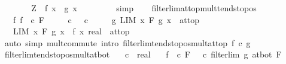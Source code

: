 \begin{isabellebody}
\ \ \ \ \isamarkupfalse%
\ \isamarkupfalse%
\ {\isachardoublequoteopen}Z\ {\isasymle}\ f\ x\ {\isacharasterisk}{\kern0pt}\ g\ x{\isachardoublequoteclose}\isanewline
\ \ \ \ \ \ \ \isamarkupfalse%
\ simp\isanewline
\ \ \isamarkupfalse%
\isanewline
{}\isamarkupfalse%
%
\endisatagproof
{\isafoldproof}%
%
\isadelimproof
\isanewline
%
\endisadelimproof
\isanewline
{}\isamarkupfalse%
\ filterlim{\isacharunderscore}{\kern0pt}at{\isacharunderscore}{\kern0pt}top{\isacharunderscore}{\kern0pt}mult{\isacharunderscore}{\kern0pt}tendsto{\isacharunderscore}{\kern0pt}pos{\isacharcolon}{\kern0pt}\isanewline
\ \ \ f{\isacharcolon}{\kern0pt}\ {\isachardoublequoteopen}{\isacharparenleft}{\kern0pt}f\ {\isasymlonglongrightarrow}\ c{\isacharparenright}{\kern0pt}\ F{\isachardoublequoteclose}\isanewline
\ \ \ \ \ c{\isacharcolon}{\kern0pt}\ {\isachardoublequoteopen}{}\ {\isacharless}{\kern0pt}\ c{\isachardoublequoteclose}\isanewline
\ \ \ \ \ g{\isacharcolon}{\kern0pt}\ {\isachardoublequoteopen}LIM\ x\ F{\isachardot}{\kern0pt}\ g\ x\ {\isacharcolon}{\kern0pt}{\isachargreater}{\kern0pt}\ at{\isacharunderscore}{\kern0pt}top{\isachardoublequoteclose}\isanewline
\ \ \ {\isachardoublequoteopen}LIM\ x\ F{\isachardot}{\kern0pt}\ {\isacharparenleft}{\kern0pt}g\ x\ {\isacharasterisk}{\kern0pt}\ f\ x{\isacharcolon}{\kern0pt}{\isacharcolon}{\kern0pt}\ real{\isacharparenright}{\kern0pt}\ {\isacharcolon}{\kern0pt}{\isachargreater}{\kern0pt}\ at{\isacharunderscore}{\kern0pt}top{\isachardoublequoteclose}\isanewline
%
\isadelimproof
\ \ %
\endisadelimproof
%
\isatagproof
{}\isamarkupfalse%
\ {\isacharparenleft}{\kern0pt}auto\ simp{\isacharcolon}{\kern0pt}\ mult{\isachardot}{\kern0pt}commute\ intro{\isacharbang}{\kern0pt}{\isacharcolon}{\kern0pt}\ filterlim{\isacharunderscore}{\kern0pt}tendsto{\isacharunderscore}{\kern0pt}pos{\isacharunderscore}{\kern0pt}mult{\isacharunderscore}{\kern0pt}at{\isacharunderscore}{\kern0pt}top\ f\ c\ g{\isacharparenright}{\kern0pt}%
\endisatagproof
{\isafoldproof}%
%
\isadelimproof
\isanewline
%
\endisadelimproof
\isanewline
{}\isamarkupfalse%
\ filterlim{\isacharunderscore}{\kern0pt}tendsto{\isacharunderscore}{\kern0pt}pos{\isacharunderscore}{\kern0pt}mult{\isacharunderscore}{\kern0pt}at{\isacharunderscore}{\kern0pt}bot{\isacharcolon}{\kern0pt}\isanewline
\ \ \ c\ {\isacharcolon}{\kern0pt}{\isacharcolon}{\kern0pt}\ real\isanewline
\ \ \ {\isachardoublequoteopen}{\isacharparenleft}{\kern0pt}f\ {\isasymlonglongrightarrow}\ c{\isacharparenright}{\kern0pt}\ F{\isachardoublequoteclose}\ {\isachardoublequoteopen}{}\ {\isacharless}{\kern0pt}\ c{\isachardoublequoteclose}\ {\isachardoublequoteopen}filterlim\ g\ at{\isacharunderscore}{\kern0pt}bot\ F{\isachardoublequoteclose}\isanewline

\end{isabellebody}
